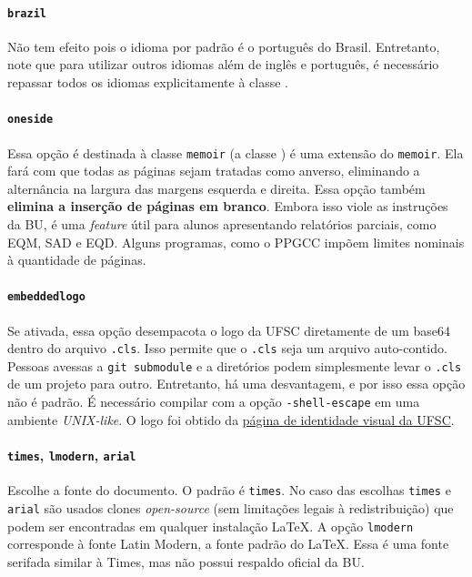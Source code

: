 \documentclass[embeddedlogo]{../ufsc-thesis-rn46-2019}
\begin{document}
\paragraph*{\texttt{brazil}} Não tem efeito pois o idioma por padrão é o
português do Brasil. Entretanto, note que para utilizar outros idiomas além de
inglês e português, é necessário repassar todos os idiomas explicitamente à
classe \abnTeX.

\paragraph*{\texttt{oneside}} Essa opção é destinada à classe \texttt{memoir} (a
classe \abnTeX) é uma extensão do \texttt{memoir}. Ela fará com que todas as
páginas sejam tratadas como anverso, eliminando a alternância na largura das
margens esquerda e direita. Essa opção também \textbf{elimina a inserção de
  páginas em branco}. Embora isso viole as instruções da BU, é uma \emph{feature} útil
para alunos apresentando relatórios parciais, como EQM, SAD e EQD. Alguns
programas, como o PPGCC impõem limites nominais à quantidade de páginas.

\paragraph*{\texttt{embeddedlogo}} Se ativada, essa opção desempacota o logo da
UFSC diretamente de um base64 dentro do arquivo \texttt{.cls}. Isso permite que
o \texttt{.cls} seja um arquivo auto-contido. Pessoas avessas a \texttt{git
  submodule} e a diretórios podem simplesmente levar o \texttt{.cls} de um
projeto para outro. Entretanto, há uma desvantagem, e por isso essa opção não é
padrão. É necessário compilar com a opção \texttt{-shell-escape} em uma ambiente
\emph{UNIX-like}. O logo foi obtido da \href{http://identidade.ufsc.br/}{página
  de identidade visual da UFSC}.

\paragraph*{\texttt{times}, \texttt{lmodern}, \texttt{arial}} Escolhe a fonte
do documento. O padrão é \texttt{times}. No caso das escolhas \texttt{times} e
\texttt{arial} são usados clones \emph{open-source} (sem limitações legais à
redistribuição) que podem ser encontradas em qualquer instalação \LaTeX. A
opção \texttt{lmodern} corresponde à fonte Latin Modern, a fonte padrão do
\LaTeX. Essa é uma fonte serifada similar à Times, mas não possui respaldo
oficial da BU.
\end{document}
